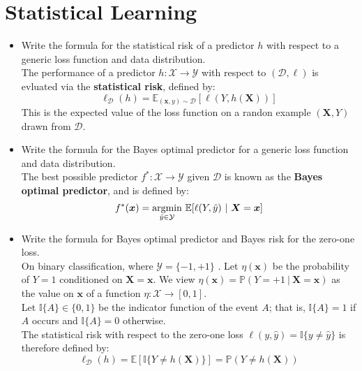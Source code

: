 \newpage
\section{Statistical Learning}

\begin{itemize}
    
    \item  Write the formula for the statistical risk of a predictor $h$ with respect to a generic loss function and data distribution.\\

        The performance of a predictor $h : \mathcal{X} \rightarrow \mathcal{Y}$ with respect to $(\mathcal{D}, \ell)$ is evluated via the \textbf{statistical risk}, defined by:
        $$
            \ell_{\mathcal{D}}(h) = \mathbb{E}_{(\boldsymbol{x}, y) \sim \mathcal{D}}[\ell(Y, h(\boldsymbol{X}))] 
        $$
        This is the expected value of the loss function on a randon example $(\boldsymbol{X}, Y)$ drawn from $\mathcal{D}$.\\

    \item Write the formula for the Bayes optimal predictor for a generic loss function and data distribution.\\

        The best possible predictor $f^{*} : \mathcal{X} \rightarrow \mathcal{Y}$ given $\mathcal{D}$ is known as the \textbf{Bayes optimal predictor}, and is defined by:
        $$
        f^{*}(\boldsymbol{x}) = \underset{\hat{y} \in \mathcal{Y}}{\textmd{argmin}}\ \mathbb{E}[\ell(Y, \hat{y})\ |\ \boldsymbol{X} = \boldsymbol{x}]
        $$

    \item Write the formula for Bayes optimal predictor and Bayes risk for the zero-one loss.\\

        On binary classification, where $\mathcal{Y} = \{-1, +1\}$ . Let $\eta(\boldsymbol{x})$ be the probability of $Y = 1$ conditioned on $\textbf{X} = \boldsymbol{x}$. We view $\eta(\boldsymbol{x}) = \mathbb{P}(Y = +1\ |\ \textbf{X} = \boldsymbol{x})$ as the value on $\boldsymbol{x}$ of a function $\eta : \mathcal{X} \rightarrow [0,1]$.\\
        Let $\mathbb{I}\{A\} \in \{0,1\}$ be the indicator function of the event $A$; that is, $\mathbb{I}\{A\} = 1$ if $A$ occurs and $\mathbb{I}\{A\} = 0$ otherwise.\\
        The statistical risk with respect to the zero-one loss $\ell(y, \hat{y}) = \mathbb{I}\{y \neq \hat{y}\}$ is therefore defined by:
        $$
        \ell_{\mathcal{D}}(h) = \mathbb{E}[\mathbb{I}\{Y \neq h(\boldsymbol{X})\}] = \mathbb{P}(Y \neq h(\boldsymbol{X}))
        $$



\end{itemize}
